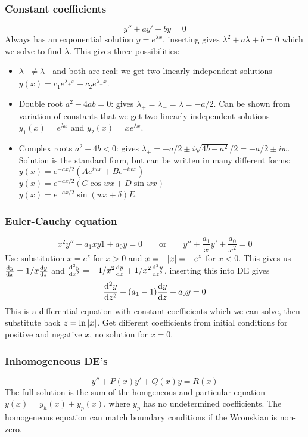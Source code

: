 \documentclass[a4paper, 10pt]{article}
\begin{document}
\begin{multicols*}{3}
\subsubsection*{\small Constant coefficients}
$$ y'' + ay' + by = 0$$
Always has an exponential solution $y=e^{\lambda x}$, inserting gives $\lambda^2 + a\lambda + b = 0$ which we solve to find $\lambda$. This gives three possibilities:
\begin{itemize}
  \item $\lambda_+ \neq \lambda_-$ and both are real: we get two linearly independent solutions $y(x) = c_1e^{\lambda_+x} + c_2e^{\lambda_-x}$.
  \item Double root $a^2-4ab=0$: gives $\lambda_+ = \lambda_- = \lambda = -a/2$. Can be shown from variation of constants that we get two linearly independent solutions $y_1(x) = e^{\lambda x}$ and $y_2(x) = xe^{\lambda x}$.
  \item Complex roots $a^2-4b<0$: gives $\lambda_{\pm} = -a/2 \pm i\sqrt{4b-a^2}/2 = -a/2 \pm iw$. Solution is the standard form, but can be written in many different forms: $y(x) = e^{-ax/2}\left(Ae^{iwx} + Be^{-iwx}\right)$\\
  $y(x) = e^{-ax/2}\left( C\cos{wx} + D\sin{wx} \right)$\\
  $y(x) = e^{-ax/2}\sin{(wx+\delta)}E$.
\end{itemize}

\subsubsection*{\small Euler-Cauchy equation}
$$ x^2y'' + a_1xy1+a_0y = 0\qquad \text{or}\qquad y''+\frac{a_1}{x}y' + \frac{a_0}{x^2}=0$$
Use substitution $x=e^{z}$ for $x>0$ and $x=-\abs{x}=-e^{z}$ for $x<0$. This gives us $\dv{y}{x}=1/x\dv{y}{z}$ and $\dv[2]{y}{x} = -1/x^2 \dv{y}{z} + 1/x^2\dv[2]{y}{z}$, inserting this into DE gives
$$ \dv[2]{y}{z} + (a_1-1)\dv{y}{z} + a_0y = 0$$
This is a differential equation with constant coefficients which we can solve, then substitute back $z=\ln{\abs{x}}$. Get different coefficients from initial conditions for positive and negative $x$, no solution for $x=0$.

\subsubsection*{Inhomogeneous DE's}
$$y'' + P(x)y' +Q(x)y = R(x)$$
The full solution is the sum of the homgeneous and particular equation $y(x)=y_{h}(x)+y_p(x)$, where $y_p$ has no undetermined coefficients. The homogeneous equation can match boundary conditions if the Wronskian is non-zero.


\end{multicols*}
\end{document}

